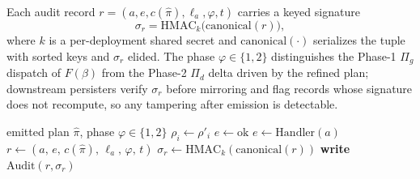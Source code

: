 Each audit record $r=(a,e,c(\hat\pi),\ell_a,\varphi,t)$ carries a keyed
signature
\begin{equation}
\sigma_r = \mathrm{HMAC}_k\!\big(\mathrm{canonical}(r)\big),
\label{eq:sign}
\end{equation}
where $k$ is a per-deployment shared secret and $\mathrm{canonical}(\cdot)$
serializes the tuple with sorted keys and $\sigma_r$ elided. The phase
$\varphi\in\{1,2\}$ distinguishes the Phase-1 $\Pi_g$ dispatch of $F(\beta)$
from the Phase-2 $\Pi_d$ delta driven by the refined plan; downstream
persisters verify $\sigma_r$ before mirroring and flag records whose
signature does not recompute, so any tampering after emission is detectable.

\begin{algorithm}[t]
\caption{Parallel dispatch with slice-control feedback (Layer~4)}
\label{alg:dispatch}
\begin{algorithmic}[1]
\Require emitted plan $\hat\pi$, phase $\varphi\in\{1,2\}$
 
      \State $\rho_i \gets \rho'_i$ 
    \EndFor
    \State $e \gets \text{ok}$
  \Else
    \State $e \gets \text{Handler}(a)$
  \EndIf
  \State $r \gets (a,\,e,\,c(\hat\pi),\,\ell_a,\,\varphi,\,t)$
  \State $\sigma_r \gets \mathrm{HMAC}_k(\mathrm{canonical}(r))$
  \State \textbf{write} $\text{Audit}(r,\sigma_r)$
\EndFor
\end{algorithmic}
\end{algorithm}

